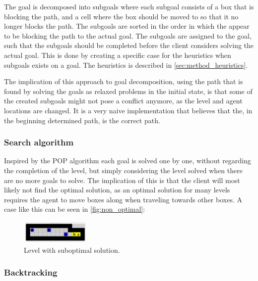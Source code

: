 \documentclass[Main]{subfiles}
\begin{document}
The goal is decomposed into subgoals where each subgoal consists of a box that is blocking the path, and a cell where the box should be moved to so that it no longer blocks the path. The subgoals are sorted in the order in which the appear to be blocking the path to the actual goal. The subgoals are assigned to the goal, such that the subgoals should be completed before the client considers solving the actual goal. This is done by creating a specific case for the heuristics when subgoals exists on a goal. The heuristics is described in \autoref{sec:method_heuristics}. 

The implication of this approach to goal decomposition, using the path that is found by solving the goals as relaxed problems in the initial state, is that some of the created subgoals might not pose a conflict anymore, as the level and agent locations are changed. It is a very naive implementation that believes that the, in the beginning determined path, is the correct path. 



\subsubsection{Search algorithm}
Inspired by the POP algorithm each goal is solved one by one, without regarding the completion of the level, but simply considering the level solved when there are no more goals to solve. The implication of this is that the client will most likely not find the optimal solution, as an optimal solution for many levels requires the agent to move boxes along when traveling towards other boxes. A case like this can be seen in \autoref{fig:non_optimal}:
\begin{figure}[h!]
    \centering
    \includegraphics[width=0.3\textwidth]{non_optimal.png}
    \caption{Level with suboptimal solution.}
    \label{fig:non_optimal}
\end{figure}




\subsubsection{Backtracking}
\end{document}
